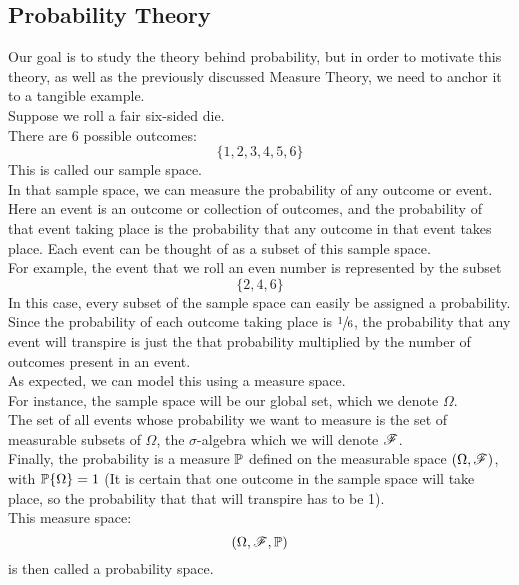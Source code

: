 \documentclass[12pt]{article}
\begin{document}
    \newpage

    \subsection*{Probability Theory}

    Our goal is to study the theory behind
    probability,
    but in order to motivate this theory,
    as well as the previously discussed
    Measure Theory,
    we need to anchor it to a tangible example. \\
    
    Suppose we roll a fair six-sided die. \\
    There are 6 possible outcomes:
    \[ \{ 1, 2, 3, 4, 5, 6 \} \]
    This is called our sample space. \\
    In that sample space,
    we can measure the probability of any
    outcome or event.
    Here an event is an outcome or collection of
    outcomes, and the probability of that event
    taking place is the probability that any 
    outcome in that event takes place.
    Each event can be thought of as a subset of
    this sample space. \\
    For example, the event that we roll
    an even number is represented by the subset
    \[ \{2, 4, 6\} \]
    In this case, every subset of the sample
    space can easily be assigned a probability.
    Since the probability of each outcome
    taking place is $\sfrac{1}{6}$,
    the probability that any event will transpire
    is just the that probability multiplied
    by the number of outcomes present in an event. \\

    As expected, we can model this using a measure
    space. \\
    For instance, the sample space will be our
    global set, which we denote $\Omega$. \\
    The set of all events whose probability
    we want to measure is the set of 
    measurable subsets of $\Omega$,
    the $\sigma$-algebra which we will
    denote $\mathscr{F}$. \\
    Finally, the probability is a measure
    $\mathbb{P}$ defined on the measurable
    space $(\Omega, \mathscr{F})$,
    with $\mathbb{P}\{\Omega\} = 1$
    (It is certain that one outcome
    in the sample space will take place,
    so the probability that that will transpire
    has to be 1). \\
    
    This measure space:
    \[ (\Omega, \mathscr{F}, \mathbb{P}) \]
    is then called a probability space. \\
\end{document}
